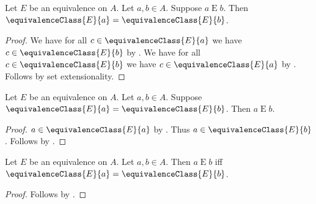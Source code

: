 \begin{proposition}\label{equiv_implies_equivanlence_classes_eq}
    Let $E$ be an equivalence on $A$.
    Let $a, b\in A$.
    Suppose $a\mathrel{E} b$.
    Then $\equivalenceClass{E}{a} = \equivalenceClass{E}{b}$.
\end{proposition}
\begin{proof}
    We have for all $c\in\equivalenceClass{E}{a}$
        we have $c\in\equivalenceClass{E}{b}$
        by .
    We have for all $c\in\equivalenceClass{E}{b}$
        we have $c\in\equivalenceClass{E}{a}$
        by .
    Follows by set extensionality.
\end{proof}

\begin{proposition}\label{equivclasses_eq_implies_equiv}
    Let $E$ be an equivalence on $A$.
    Let $a, b\in A$.
    Suppose $\equivalenceClass{E}{a} = \equivalenceClass{E}{b}$.
    Then $a\mathrel{E} b$.
\end{proposition}
\begin{proof}
    $a\in\equivalenceClass{E}{a}$ by .
    Thus $a\in\equivalenceClass{E}{b}$.
    Follows by .
\end{proof}

\begin{proposition}\label{equiv_iff_equivclasses_eq}
    Let $E$ be an equivalence on $A$.
    Let $a, b\in A$.
    Then $a\mathrel{E} b$ iff $\equivalenceClass{E}{a} = \equivalenceClass{E}{b}$.
\end{proposition}
\begin{proof}
    Follows by .
\end{proof}

